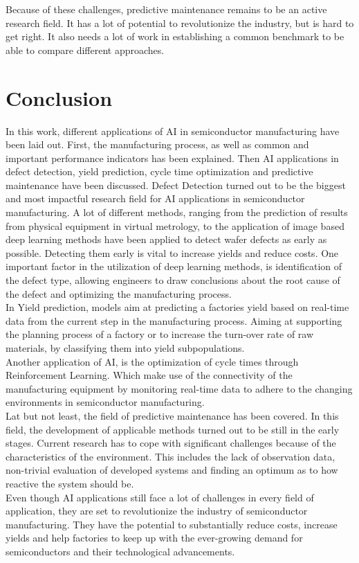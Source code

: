 \documentclass{Academic}
\begin{document}
    Because of these challenges, predictive maintenance remains to be an active research field. It has a lot of potential to revolutionize the industry, but is hard to get right. It also needs a lot of work in establishing a common benchmark to be able to compare different approaches.

    \section{Conclusion}
    In this work, different applications of AI in semiconductor manufacturing have been laid out. First, the manufacturing process, as well as common and important performance indicators has been explained. Then AI applications in defect detection, yield prediction, cycle time optimization and predictive maintenance have been discussed. Defect Detection turned out to be the biggest and most impactful research field for AI applications in semiconductor manufacturing. A lot of different methods, ranging from the prediction of results from physical equipment in virtual metrology, to the application of image based deep learning methods have been applied to detect wafer defects as early as possible. Detecting them early is vital to increase yields and reduce costs. One important factor in the utilization of deep learning methods, is identification of the defect type, allowing engineers to draw conclusions about the root cause of the defect and optimizing the manufacturing process.\\
    In Yield prediction, models aim at predicting a factories yield based on real-time data from the current step in the manufacturing process. Aiming at supporting the planning process of a factory or to increase the turn-over rate of raw materials, by classifying them into yield subpopulations.\\
    Another application of AI, is the optimization of cycle times through Reinforcement Learning. Which make use of the connectivity of the manufacturing equipment by monitoring real-time data to adhere to the changing environments in semiconductor manufacturing.\\
    Lat but not least, the field of predictive maintenance has been covered. In this field, the development of applicable methods turned out to be still in the early stages. Current research has to cope with significant challenges because of the characteristics of the environment. This includes the lack of observation data, non-trivial evaluation of developed systems and finding an optimum as to how reactive the system should be. \\
    Even though AI applications still face a lot of challenges in every field of application, they are set to revolutionize the industry of semiconductor manufacturing. They have the potential to substantially reduce costs, increase yields and help factories to keep up with the ever-growing demand for semiconductors and their technological advancements.
\end{document}
